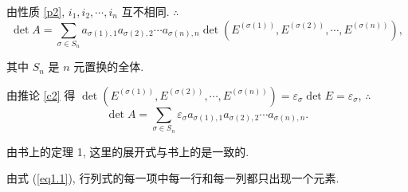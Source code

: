 \documentclass[color=black,device=normal,lang=cn,mode=geye]{elegantnote}
\begin{document}
由性质 \ref{p2}, $i_1,i_2,\cdots,i_n$ 互不相同. $\therefore$
\[\det A=\sum\limits_{\sigma\in S_n}a_{\sigma(1),1}a_{\sigma(2),2}\cdots a_{\sigma(n),n}\det\left(E^{(\sigma(1))},E^{(\sigma(2))},\cdots,E^{(\sigma(n))}\right),\]

其中 $S_n$ 是 $n$ 元置换的全体.

由推论 \ref{c2} 得 $\det\left(E^{(\sigma(1))},E^{(\sigma(2))},\cdots,E^{(\sigma(n))}\right)=\varepsilon_\sigma\det E=\varepsilon_\sigma$, $\therefore$
\begin{equation}\label{eq1.1}
    \det A=\sum\limits_{\sigma\in S_n}\varepsilon_\sigma a_{\sigma(1),1}a_{\sigma(2),2}\cdots a_{\sigma(n),n}.
\end{equation}

由书上的定理 1, 这里的展开式与书上的是一致的.

由式 (\ref{eq1.1}), 行列式的每一项中每一行和每一列都只出现一个元素.
\end{document}
